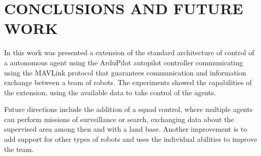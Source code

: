 \section{CONCLUSIONS AND FUTURE WORK}
\label{sec:conclusion}

In this work was presented a extension of the standard architecture of control of a autonomous agent using the ArduPilot autopilot controller communicating using the MAVLink protocol that guarantees communication and information exchange between a team of robots.
The experiments showed the capabilities of the extension, using the available data to take control of the agents.

Future directions include the addition of a squad control, where multiple agents can perform missions of surveillance or search, exchanging data about the supervised area among then and with a land base.
Another improvement is to add support for other types of robots and uses the individual abilities to improve the team.

